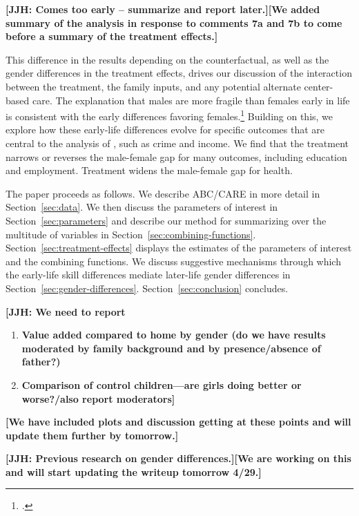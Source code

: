 \textbf{[JJH: Comes too early -- summarize and report later.][We added summary of the analysis in response to comments 7a and 7b to come before a summary of the treatment effects.]}

This difference in the results depending on the counterfactual, as well as the gender differences in the treatment effects, drives our discussion of the interaction between the treatment, the family inputs, and any potential alternate center-based care. The explanation that males are more fragile than females early in life is consistent with the early differences favoring females.\footnote{\citet{Kottelenberg-Lehrer_2014_Gender-Effects,Baker_Gruber_Milligan_2015_Noncog_Defects, Schore_2017_IMHJ}.} Building on this, we explore how these early-life differences evolve for specific outcomes that are central to the analysis of  \citet{Garcia_Heckman_Leaf_etal_2017_Comp_CBA_Unpublished}, such as crime and income. We find that the treatment narrows or reverses the male-female gap for many outcomes, including education and employment. Treatment widens the male-female gap for health.

The paper proceeds as follows. We describe ABC/CARE in more detail in Section~\ref{sec:data}. We then discuss the parameters of interest in Section~\ref{sec:parameters} and describe our method for summarizing over the multitude of variables in Section~\ref{sec:combining-functions}. Section~\ref{sec:treatment-effects} displays the estimates of the parameters of interest and the combining functions. We discuss suggestive mechanisms through which the early-life skill differences mediate later-life gender differences in Section~\ref{sec:gender-differences}. Section~\ref{sec:conclusion} concludes.


\textbf{[JJH: We need to report}
\begin{enumerate}[7(a)]
\item \textbf{Value added compared to home by gender (do we have results moderated by family background and by presence/absence of father?)}
\item \textbf{Comparison of control children---are girls doing better or worse?/also report moderators]}
\end{enumerate}

\textbf{[We have included plots and discussion getting at these points and will update them further by tomorrow.]}

\textbf{[JJH: Previous research on gender differences.][We are working on this and will start updating the writeup tomorrow 4/29.]}

